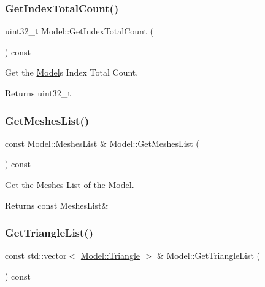 \subsubsection{\texorpdfstring{Get\+Index\+Total\+Count()}{GetIndexTotalCount()}}
{\footnotesize\ttfamily uint32\+\_\+t Model\+::\+Get\+Index\+Total\+Count (\begin{DoxyParamCaption}{ }\end{DoxyParamCaption}) const}



Get the \hyperlink{classModel}{Model}\textquotesingle{}s Index Total Count. 

\begin{DoxyReturn}{Returns}
uint32\+\_\+t 
\end{DoxyReturn}
\mbox{\label{classModel_a759f50783d758801f2893d8991acb349}} 
\subsubsection{\texorpdfstring{Get\+Meshes\+List()}{GetMeshesList()}}
{\footnotesize\ttfamily const Model\+::\+Meshes\+List \& Model\+::\+Get\+Meshes\+List (\begin{DoxyParamCaption}{ }\end{DoxyParamCaption}) const}



Get the Meshes List of the \hyperlink{classModel}{Model}. 

\begin{DoxyReturn}{Returns}
const Meshes\+List\& 
\end{DoxyReturn}
\mbox{\label{classModel_a4bceb2cedfa99f87ae84763d27a00986}} 
\subsubsection{\texorpdfstring{Get\+Triangle\+List()}{GetTriangleList()}}
{\footnotesize\ttfamily const std\+::vector$<$ \hyperlink{structModel_1_1Triangle}{Model\+::\+Triangle} $>$ \& Model\+::\+Get\+Triangle\+List (\begin{DoxyParamCaption}{ }\end{DoxyParamCaption}) const}



